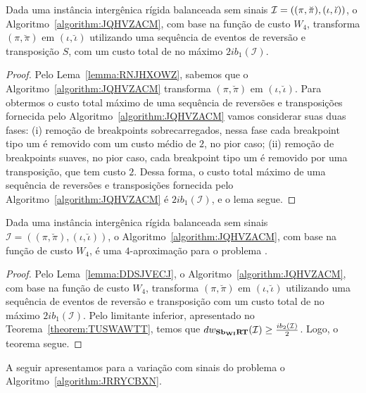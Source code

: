 \begin{lemma}\label{lemma:DDSJVECJ}
Dada uma instância intergênica rígida balanceada sem sinais $\mathcal{I}=((\pi,\breve\pi),\break(\iota,\breve\iota))$, o Algoritmo~\ref{algorithm:JQHVZACM}, com base na função de custo $W_4$, transforma $(\pi,\breve\pi)$ em $(\iota,\breve\iota)$ utilizando uma sequência de eventos de reversão e transposição $S$, com um custo total de no máximo $2ib_1(\mathcal{I})$.
\end{lemma}
\begin{proof}
Pelo Lema~\ref{lemma:RNJHXOWZ}, sabemos que o Algoritmo~\ref{algorithm:JQHVZACM} transforma $(\pi,\breve\pi)$ em $(\iota,\breve\iota)$. Para obtermos o custo total máximo de uma sequência de reversões e transposições fornecida pelo Algoritmo~\ref{algorithm:JQHVZACM} vamos considerar suas duas fases: (i) remoção de breakpoints sobrecarregados, nessa fase cada breakpoint tipo um é removido com um custo médio de $2$, no pior caso; (ii) remoção de breakpoints suaves, no pior caso, cada breakpoint tipo um é removido por uma transposição, que tem custo $2$. Dessa forma, o custo total máximo de uma sequência de reversões e transposições fornecida pelo Algoritmo~\ref{algorithm:JQHVZACM} é $2ib_1(\mathcal{I})$, e o lema segue. 
\end{proof}

\begin{theorem}\label{theorem:CQXBDUDY}
Dada uma instância intergênica rígida balanceada sem sinais $\mathcal{I}=((\pi,\breve\pi),(\iota,\breve\iota))$, o Algoritmo~\ref{algorithm:JQHVZACM}, com base na função de custo $W_4$, é uma $4$-aproximação para o problema \SbWIRT{}.
\end{theorem}
\begin{proof}
Pelo Lema~\ref{lemma:DDSJVECJ}, o Algoritmo~\ref{algorithm:JQHVZACM}, com base na função de custo $W_4$, transforma $(\pi,\breve\pi)$ em $(\iota,\breve\iota)$ utilizando uma sequência de eventos de reversão e transposição com um custo total de no máximo $2ib_1(\mathcal{I})$. Pelo limitante inferior, apresentado no Teorema~\ref{theorem:TUSWAWTT}, temos que $dw_{\textbf{Sb\textsubscript{WI}RT}}(\mathcal{I}) \ge \frac{ib_2(\mathcal{I})}{2}$. Logo, o teorema segue.
\end{proof}

A seguir apresentamos para a variação com sinais do problema \SbWIRT{} o Algoritmo~\ref{algorithm:JRRYCBXN}.



